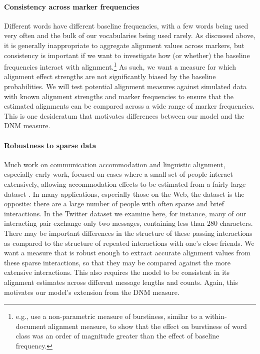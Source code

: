 \documentclass{acm_proc_article-sp}
\begin{document}
\paragraph{Consistency across marker frequencies} Different words have different baseline frequencies, with a few words being used very often and the bulk of our vocabularies being used rarely. As discussed above, it is generally inappropriate to aggregate alignment values across markers, but consistency is important if we want to investigate how (or whether) the baseline frequencies interact with alignment.\footnote{e.g., \cite{Church2000} use a non-parametric measure of burstiness, similar to a within-document alignment measure, to show that the effect on burstiness of word class was an order of magnitude greater than the effect of baseline frequency.}   As such, we want a measure for which alignment effect strengths are not significantly biased by the baseline probabilities.  We will test potential alignment measures against simulated data with known alignment strengths and marker frequencies to ensure that the estimated alignments can be compared across a wide range of marker frequencies.  This is one desideratum that motivates differences between our model and the DNM measure.

\paragraph{Robustness to sparse data} Much work on communication accommodation and linguistic alignment, especially early work, focused on cases where a small set of people interact extensively, allowing accommodation effects to be estimated from a fairly large dataset \cite{Ferrara1991,GonzalesHancockPennebaker2010,IrelandEtAl2011}.  In many applications, especially those on the Web, the dataset is the opposite: there are a large number of people with often sparse and brief interactions.  In the Twitter dataset we examine here, for instance, many of our interacting pair exchange only two messages, containing less than 280 characters.  There may be important differences in the structure of these passing interactions as compared to the structure of repeated interactions with one's close friends.  We want a measure that is robust enough to extract accurate alignment values from these sparse interactions, so that they may be compared against the more extensive interactions.  This also requires the model to be consistent in its alignment estimates across different message lengths and counts. Again, this motivates our model's extension from the DNM measure.
\end{document}
